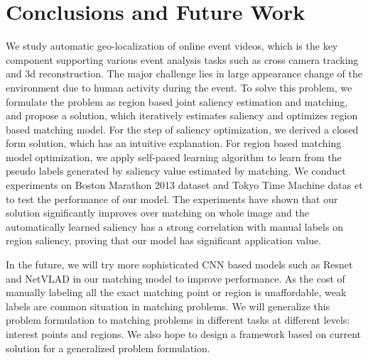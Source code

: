 \section{Conclusions and Future Work}
\label{sec:conclusion}
We study automatic geo-localization of online event videos, which is the key component supporting various event analysis tasks such as cross camera tracking and 3d reconstruction. 
The major challenge lies in large appearance change of the environment due to human activity during the event. 
To solve this problem, we formulate the problem as region based joint saliency estimation and matching, and propose a solution, which iteratively estimates saliency and optimizes region based matching model.  
For the step of saliency optimization, we derived a closed form solution, which has an intuitive explanation. 
For region based matching model optimization, we apply self-paced learning algorithm to learn from the pseudo labels generated by saliency value estimated by matching. 
We conduct experiments on Boston Marathon 2013 dataset and Tokyo Time Machine datas	et to test the performance of our model. 
The experiments have shown that our solution significantly improves over matching on whole image and the automatically learned saliency has a strong correlation with manual labels on region saliency, proving that our model has significant application value. 

In the future, we will try more sophisticated CNN based models such as Resnet and NetVLAD in our matching model to improve performance.  
As the cost of manually labeling all the exact matching point or region is unaffordable, weak labels are common situation in matching problems. 
We will generalize this problem formulation to matching problems in different tasks at different levels: interest points and regions. 
We also hope to design a framework based on current solution for a generalized problem formulation.

